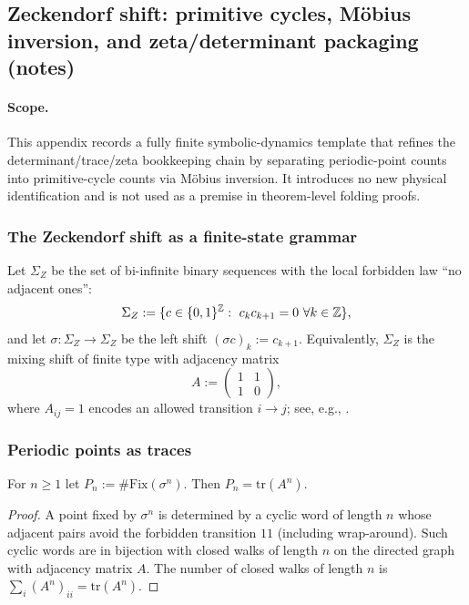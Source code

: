 \subsection{Zeckendorf shift: primitive cycles, M\"obius inversion, and zeta/determinant packaging (notes)}
\label{app:zeckendorf_shift_prime_cycles}

\paragraph{Scope.}
\MathTag This appendix records a fully finite symbolic-dynamics template that refines the determinant/trace/zeta bookkeeping chain
by separating periodic-point counts into primitive-cycle counts via M\"obius inversion.
It introduces no new physical identification and is not used as a premise in theorem-level folding proofs.

\subsubsection{The Zeckendorf shift as a finite-state grammar}
\label{subsec:zeckendorf_shift_definition}

\MathTag Let $\Sigma_Z$ be the set of bi-infinite binary sequences with the local forbidden law ``no adjacent ones'':
\[
\Sigma_Z:=\{c\in\{0,1\}^{\ZZ}:\ c_k c_{k+1}=0\ \forall k\in\ZZ\},
\]
and let $\sigma:\Sigma_Z\to\Sigma_Z$ be the left shift $(\sigma c)_k:=c_{k+1}$.
Equivalently, $\Sigma_Z$ is the mixing shift of finite type with adjacency matrix
\[
A:=\begin{pmatrix}1&1\\ 1&0\end{pmatrix},
\]
where $A_{ij}=1$ encodes an allowed transition $i\to j$; see, e.g., \cite{LindMarcus1995}.

\subsubsection{Periodic points as traces}
\label{subsec:zeckendorf_shift_traces}

\begin{proposition}\label{prop:zeckendorf_shift_trace_formula}
\MathTag For $n\ge 1$ let $P_n:=\#\mathrm{Fix}(\sigma^n)$.
Then $P_n=\mathrm{tr}(A^n)$.
\end{proposition}

\begin{proof}
A point fixed by $\sigma^n$ is determined by a cyclic word of length $n$ whose adjacent pairs avoid the forbidden transition $11$ (including wrap-around).
Such cyclic words are in bijection with closed walks of length $n$ on the directed graph with adjacency matrix $A$.
The number of closed walks of length $n$ is $\sum_i(A^n)_{ii}=\mathrm{tr}(A^n)$.
\end{proof}

